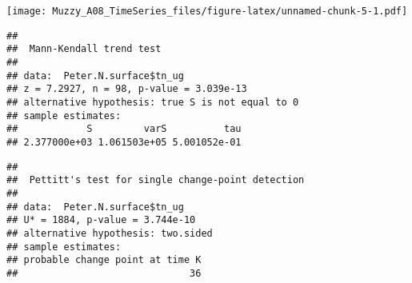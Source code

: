 \documentclass[]{article}
\newenvironment{Shaded}{\begin{snugshade}}{\end{snugshade}}
\newcommand{\KeywordTok}[1]{\textcolor[rgb]{0.13,0.29,0.53}{\textbf{#1}}}
\newcommand{\DecValTok}[1]{\textcolor[rgb]{0.00,0.00,0.81}{#1}}
\newcommand{\StringTok}[1]{\textcolor[rgb]{0.31,0.60,0.02}{#1}}
\newcommand{\CommentTok}[1]{\textcolor[rgb]{0.56,0.35,0.01}{\textit{#1}}}
\newcommand{\OperatorTok}[1]{\textcolor[rgb]{0.81,0.36,0.00}{\textbf{#1}}}
\newcommand{\NormalTok}[1]{#1}
\begin{document}
\texttt{[image: Muzzy\_A08\_TimeSeries\_files/figure-latex/unnamed-chunk-5-1.pdf]}

\begin{Shaded}
\end{Shaded}

\begin{verbatim}
## 
##  Mann-Kendall trend test
## 
## data:  Peter.N.surface$tn_ug
## z = 7.2927, n = 98, p-value = 3.039e-13
## alternative hypothesis: true S is not equal to 0
## sample estimates:
##            S         varS          tau 
## 2.377000e+03 1.061503e+05 5.001052e-01
\end{verbatim}

\begin{Shaded}
\end{Shaded}

\begin{verbatim}
## 
##  Pettitt's test for single change-point detection
## 
## data:  Peter.N.surface$tn_ug
## U* = 1884, p-value = 3.744e-10
## alternative hypothesis: two.sided
## sample estimates:
## probable change point at time K 
##                              36
\end{verbatim}

\begin{Shaded}
\end{Shaded}
\end{document}
